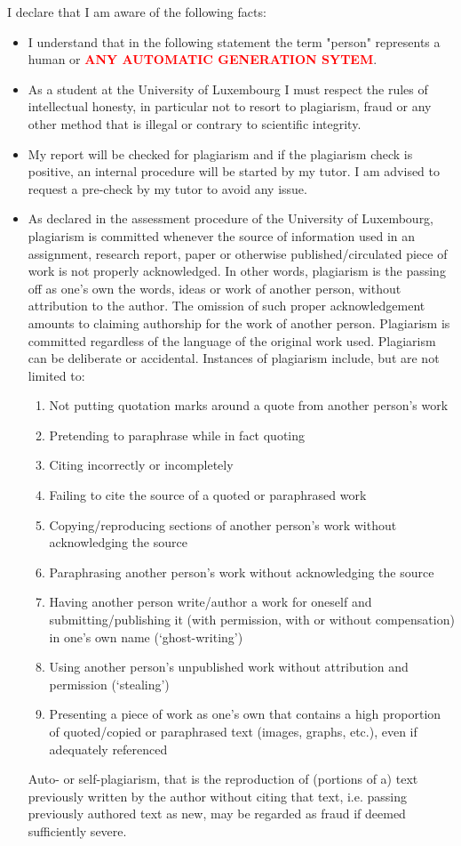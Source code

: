\documentclass[conference,compsoc]{IEEEtran}
\begin{document}
I declare that I am aware of the following facts:
\begin{itemize}
	\item I understand that in the following statement the term "person" represents a human or \textbf{\textcolor{red}{ANY AUTOMATIC GENERATION SYTEM}}.
	\item As a student at the University of Luxembourg I must respect the rules of intellectual honesty, in particular not to resort to plagiarism, fraud or any other method that is illegal or contrary to scientific integrity.
	\item My report will be checked for plagiarism and if the plagiarism check is positive, an internal procedure will be started by my tutor. I am advised to request a pre-check by my tutor to avoid any issue.
	\item As declared in the assessment procedure of the University of Luxembourg, plagiarism is committed whenever the source of information used in an assignment, research report, paper or otherwise published/circulated piece of work is not properly acknowledged. In other words, plagiarism is the passing off as one’s own the words, ideas or work of another person, without attribution to the author. The omission of such proper acknowledgement amounts to claiming authorship for the work of another person. Plagiarism is committed regardless of the language of the original work used. Plagiarism can be deliberate or accidental.
	      Instances of plagiarism include, but are not limited to:
	      \begin{enumerate}
		      \item Not putting quotation marks around a quote from another person’s work
		      \item Pretending to paraphrase while in fact quoting
		      \item Citing incorrectly or incompletely
		      \item Failing to cite the source of a quoted or paraphrased work
		      \item Copying/reproducing sections of another person’s work without acknowledging the source
		      \item Paraphrasing another person’s work without acknowledging the source
		      \item Having another person write/author a work for oneself and submitting/publishing it (with permission, with or without compensation) in one’s own name (‘ghost-writing’)
		      \item Using another person’s unpublished work without attribution and permission (‘stealing’)
		      \item Presenting a piece of work as one’s own that contains a high proportion of quoted/copied or paraphrased text (images, graphs, etc.), even if adequately referenced
	      \end{enumerate}
	      Auto- or self-plagiarism, that is the reproduction of (portions of a) text previously written by the author without citing that text, i.e. passing previously authored text as new, may be regarded as fraud if deemed sufficiently severe.
\end{itemize}
\end{document}
